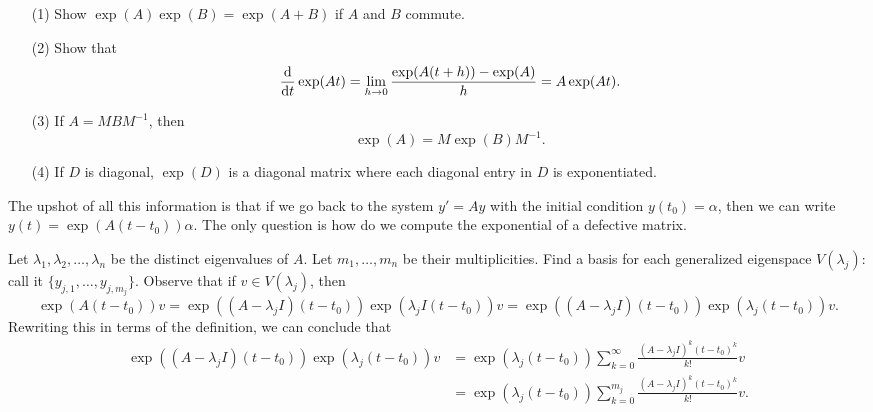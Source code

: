 \documentclass{article}
\begin{document}
\begin{theorem}[Exercises.]{}
    \begin{itemize}
        \item[(1)] Show $\exp(A) \exp(B) = \exp(A + B)$ if $A$ and $B$ commute. 
        \item[(2)] Show that 
            \[
                \dv{t} \exp(At) = \lim_{h \to 0} \frac{\exp(A(t + h)) - \exp(A)}{h} = A \exp(At).
            \]   
        \item[(3)] If $A = MBM^{-1}$, then 
            \[
                \exp(A) = M \exp(B) M^{-1}.
            \]
        \item[(4)] If $D$ is diagonal, $\exp(D)$ is a diagonal matrix where each diagonal entry in $D$ is exponentiated. 
    \end{itemize}
\end{theorem}

The upshot of all this information is that if we go back to the system $y' = Ay$ with the initial condition $y(t_0) = \alpha$, then we can write $y(t) = \exp(A(t - t_0))\alpha$. The only question is how do we compute the exponential of a defective matrix. 
\newpar

Let $\lambda_1, \lambda_2, \hdots, \lambda_n$ be the distinct eigenvalues of $A$. Let $m_1, \hdots, m_n$ be their multiplicities. Find a basis for each generalized eigenspace $V(\lambda_j)$: call it $\{y_{j, 1}, \hdots, y_{j, m_j}\}$. Observe that if $v \in V(\lambda_j)$, then 
    \[
        \exp(A(t - t_0))v =  \exp((A - \lambda_jI)(t - t_0))\exp(\lambda_jI(t -t_0))v = \exp((A - \lambda_jI)(t - t_0))\exp(\lambda_j(t -t_0))v.
    \]
Rewriting this in terms of the definition, we can conclude that 
    \begin{align*}
        \exp((A - \lambda_jI)(t - t_0))\exp(\lambda_j(t -t_0))v &= \exp(\lambda_j(t - t_0)) \sum_{k = 0}^{\infty} \frac{(A - \lambda_j I)^k(t - t_0)^k}{k!} v \\
        &= \exp(\lambda_j(t - t_0)) \sum_{k = 0}^{m_j} \frac{(A - \lambda_j I)^k(t - t_0)^k}{k!} v.
    \end{align*}
\end{document}
